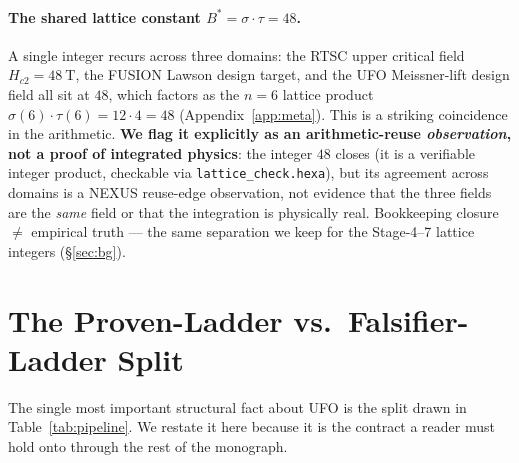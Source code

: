 \documentclass[11pt,a4paper]{article}
\begin{document}
\paragraph{The shared lattice constant $B^{*}=\sigma\!\cdot\!\tau=48$.}
A single integer recurs across three domains: the RTSC upper critical
field $H_{c2}=\SI{48}{\tesla}$, the FUSION Lawson design target, and the
UFO Meissner-lift design field all sit at $48$, which factors as the
$n\!=\!6$ lattice product $\sigma(6)\!\cdot\!\tau(6)=12\!\cdot\!4=48$
(Appendix~\ref{app:meta}). This is a striking coincidence in the
arithmetic. \textbf{We flag it explicitly as an arithmetic-reuse
\emph{observation}, not a proof of integrated physics}: the integer
$48$ closes (it is a verifiable integer product, checkable via
\texttt{lattice\_check.hexa}), but its agreement across domains is a
NEXUS reuse-edge observation, not evidence that the three fields are the
\emph{same} field or that the integration is physically real. Bookkeeping
closure $\ne$ empirical truth --- the same separation we keep for the
Stage-4--7 lattice integers (\S\ref{sec:bg}).

\section{The Proven-Ladder vs.\ Falsifier-Ladder Split}
\label{sec:split}

The single most important structural fact about UFO is the split drawn
in Table~\ref{tab:pipeline}. We restate it here because it is the
contract a reader must hold onto through the rest of the monograph.
\end{document}
